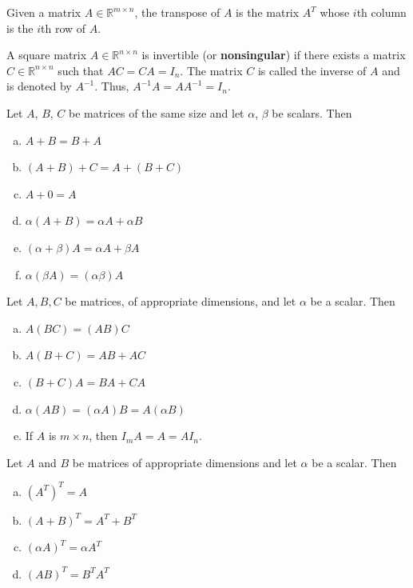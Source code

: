 \begin{definition}
    Given a matrix $A \in \mathbb{R}^{m \times n}$, the transpose of $A$ is the matrix $A^T$ whose $i$th column is the $i$th row of $A$.
\end{definition}

\begin{definition}
    A square matrix \( A \in \mathbb{R}^{n \times n} \) is invertible (or \textbf{nonsingular}) if there exists a matrix \( C \in \mathbb{R}^{n \times n} \) such that \( A C = C A = I_n \). The matrix \( C \) is called the inverse of \( A \) and is denoted by \( A^{-1} \). Thus, \( A^{-1} A = A A^{-1} = I_n \).
\end{definition}

\begin{theorem}

    Let $A$, $B$, $C$ be matrices of the same size and let $\alpha$, $\beta$ be scalars. Then
    \begin{enumerate}[(a)]
        \item $A+B=B+A$
        \item $(A+B)+C=A+(B+C)$
        \item $A+0=A$
        \item $\alpha(A+B)=\alpha A+\alpha B$
        \item $(\alpha+\beta) A=\alpha A+\beta A$
        \item $\alpha(\beta A)=(\alpha \beta) A$
    \end{enumerate}
\end{theorem}

\begin{theorem}
        Let $A, B, C$ be matrices, of appropriate dimensions, and let $\alpha$ be a scalar. Then
\begin{enumerate}[(a)]
    \item $A(BC) = (AB)C$
    \item $A(B + C) = AB + AC$
    \item $(B + C)A = BA + CA$
    \item $\alpha(AB) = (\alpha A)B = A(\alpha B)$
    \item If $A$ is $m\times n$, then $I_mA=A=AI_n$.
\end{enumerate}
\end{theorem}

\begin{theorem}
    Let $A$ and $B$ be matrices of appropriate dimensions and let $\alpha$ be a scalar. Then
    \begin{enumerate}[(a)]
        \item $(A^T)^T = A$
        \item $(A + B)^T = A^T + B^T$
        \item $(\alpha A)^T = \alpha A^T$
        \item $(AB)^T = B^T A^T$
    \end{enumerate}
\end{theorem}

